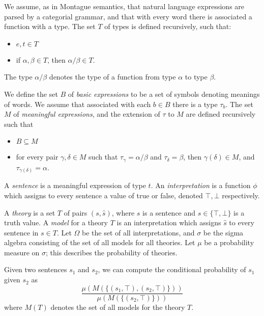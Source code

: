 \documentclass[letterpaper]{article}
\begin{document}
We assume, as in Montague semantics, that natural language expressions
are parsed by a categorial grammar, and that with every word there is
associated a function with a type. The set $T$ of types is defined
recursively, such that:
\begin{itemize}
\item $e,t\in T$
\item if $\alpha, \beta\in T$, then $\alpha/\beta\in T$.
\end{itemize}
The type $\alpha/\beta$ denotes the type of a function from type
$\alpha$ to type $\beta$.

We define the set $B$ of \emph{basic expressions} to be a set of
symbols denoting meanings of words. We assume that associated with
each $b\in B$ there is a type $\tau_b$. The set $M$ of
\emph{meaningful expressions}, and the extension of $\tau$ to $M$ are
defined recursively such that
\begin{itemize}
\item $B\subseteq M$
\item for every pair $\gamma,\delta\in M$ such that $\tau_\gamma =
  \alpha/\beta$ and $\tau_\delta = \beta$, then $\gamma(\delta)\in
  M$, and $\tau_{\gamma(\delta)} = \alpha$.
\end{itemize}

A \emph{sentence} is a meaningful expression of type $t$. An
\emph{interpretation} is a function $\phi$ which assigns to every
sentence a value of true or false, denoted $\top, \bot$ respectively.

A \emph{theory} is a set $T$ of pairs $(s,\hat{s})$, where $s$ is a
sentence and $\hat{s}\in\{\top,\bot\}$ is a truth value. A
\emph{model} for a theory $T$ is an interpretation which assigns
$\hat{s}$ to every sentence in $s\in T$. Let $\Omega$ be the set of
all interpretations, and $\sigma$ be the sigma algebra consisting of
the set of all models for all theories. Let $\mu$ be a probability
measure on $\sigma$; this describes the probability of theories.

Given two sentences $s_1$ and $s_2$, we can compute the conditional
probability of $s_1$ given $s_2$ as
$$\frac{\mu(M(\{(s_1, \top), (s_2, \top)\}))}{\mu(M(\{(s_2,\top)\}))}$$
where $M(T)$ denotes the set of all models for the theory $T$.
\end{document}

